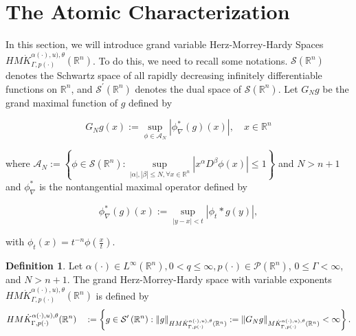 \documentclass[oneside,reqno]{amsart}
\numberwithin{equation}{section}
\theoremstyle{definition}
\newtheorem{defn}[theorem]{Definition}
\begin{document}
\section{ The Atomic Characterization}
In this section, we will introduce grand variable Herz-Morrey-Hardy Spaces  $H M\dot{K} ^{\alpha(\cdot),u),\theta}_{ \Gamma, p(\cdot)}(\mathbb{R}^n)$. To do this, we need to recall some notations. $\mathcal{S}\left(\mathbb{R}^{n}\right)$ denotes the Schwartz space of all rapidly decreasing infinitely differentiable functions on $\mathbb{R}^{n}$, and $\mathcal{S}^{\prime}\left(\mathbb{R}^{n}\right)$ denotes the dual space of $\mathcal{S}\left(\mathbb{R}^{n}\right)$. Let $G_{N}g $ be the grand maximal function of $g$ defined by


\begin{equation*}
G_{N}g (x):=\sup _{\phi \in \mathcal{A}_{N}}\left|\phi_{\nabla}^{*}(g)(x)\right|, \quad x \in \mathbb{R}^{n} 
\end{equation*}


where $\mathcal{A}_{N}:=\left\{\phi \in \mathcal{S}\left(\mathbb{R}^{n}\right): \sup \limits_{|\alpha|,|\beta| \leq  N, \forall x \in \mathbb{R}^{n}}\left|x^{\alpha} D^{\beta} \phi(x)\right| \leq  1\right\}$ and $N>n+1$ and $\phi_{\nabla}^{*}$ is the nontangential maximal operator defined by

$$\phi_{\nabla}^{*}(g)(x):=\sup \limits _{|y-x|<t}\left|\phi_{t} * g(y)\right|,$$

with $\phi_{t}(x)=t^{-n} \phi\left(\frac{x}{t} \right).$




\begin{defn}
    Let $\alpha(\cdot) \in L^{\infty}\left(\mathbb{R}^{n}\right), 0<q \leq \infty, p(\cdot) \in \mathcal{P}\left(\mathbb{R}^{n}\right)$, $0 \leq \Gamma<\infty$, and $N>n+1$. The grand Herz-Morrey-Hardy space with variable exponents $H M\dot{K} ^{\alpha(\cdot),u),\theta}_{ \Gamma, p(\cdot)}(\mathbb{R}^n)$ is defined  by
$$H M \dot{K} ^{\alpha(\cdot),u),\theta}_{ \Gamma, p(\cdot)}(\mathbb{R}^n) \\
\quad:=\left\{g \in \mathcal{S}^{\prime}\left(\mathbb{R}^{n}\right):\|g\|_{HM\dot{K} ^{\alpha(\cdot),u),\theta}_{ \Gamma, p(\cdot)}(\mathbb{R}^n)}:=\left\|G_{N}g \right\|_{M\dot{K} ^{\alpha(\cdot),u),\theta}_{ \Gamma, p(\cdot)}(\mathbb{R}^n)}<\infty\right\}.$$


\end{defn}
\end{document}
